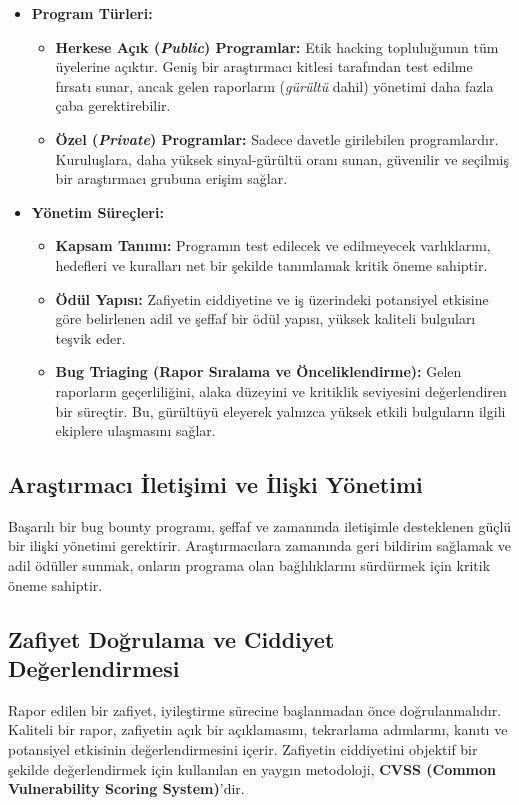 \begin{itemize}
\item \textbf{Program Türleri:}
\begin{itemize}
\item \textbf{Herkese Açık (\textit{Public}) Programlar:} Etik hacking topluluğunun tüm üyelerine açıktır. Geniş bir araştırmacı kitlesi tarafından test edilme fırsatı sunar, ancak gelen raporların (\textit{gürültü} dahil) yönetimi daha fazla çaba gerektirebilir.
\item \textbf{Özel (\textit{Private}) Programlar:} Sadece davetle girilebilen programlardır. Kuruluşlara, daha yüksek sinyal-gürültü oranı sunan, güvenilir ve seçilmiş bir araştırmacı grubuna erişim sağlar.
\end{itemize}
\item \textbf{Yönetim Süreçleri:}
\begin{itemize}
\item \textbf{Kapsam Tanımı:} Programın test edilecek ve edilmeyecek varlıklarını, hedefleri ve kuralları net bir şekilde tanımlamak kritik öneme sahiptir.
\item \textbf{Ödül Yapısı:} Zafiyetin ciddiyetine ve iş üzerindeki potansiyel etkisine göre belirlenen adil ve şeffaf bir ödül yapısı, yüksek kaliteli bulguları teşvik eder.
\item \textbf{Bug Triaging (Rapor Sıralama ve Önceliklendirme):} Gelen raporların geçerliliğini, alaka düzeyini ve kritiklik seviyesini değerlendiren bir süreçtir. Bu, gürültüyü eleyerek yalnızca yüksek etkili bulguların ilgili ekiplere ulaşmasını sağlar.
\end{itemize}
\end{itemize}

\subsection{Araştırmacı İletişimi ve İlişki Yönetimi}

Başarılı bir bug bounty programı, şeffaf ve zamanında iletişimle desteklenen güçlü bir ilişki yönetimi gerektirir. Araştırmacılara zamanında geri bildirim sağlamak ve adil ödüller sunmak, onların programa olan bağlılıklarını sürdürmek için kritik öneme sahiptir.

\subsection{Zafiyet Doğrulama ve Ciddiyet Değerlendirmesi}

Rapor edilen bir zafiyet, iyileştirme sürecine başlanmadan önce doğrulanmalıdır. Kaliteli bir rapor, zafiyetin açık bir açıklamasını, tekrarlama adımlarını, kanıtı ve potansiyel etkisinin değerlendirmesini içerir. Zafiyetin ciddiyetini objektif bir şekilde değerlendirmek için kullanılan en yaygın metodoloji, \textbf{CVSS (Common Vulnerability Scoring System)}'dir.

